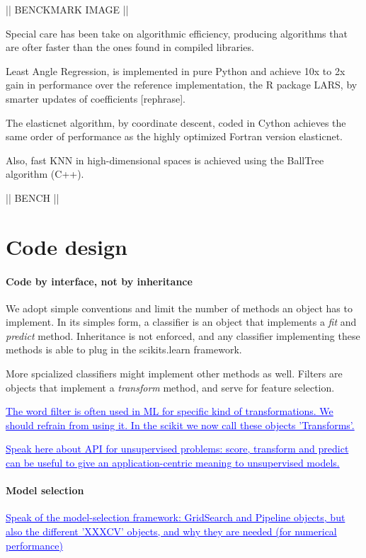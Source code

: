 \documentclass[twoside,11pt]{article}
\newcommand{\GAEL}[1]{\textcolor{blue}{\uline{#1}}}
\begin{document}
|| BENCKMARK IMAGE ||


Special care has been take on algorithmic efficiency, producing
algorithms that are ofter faster than the ones found in compiled
libraries.



Least Angle Regression, is implemented in pure Python and achieve 10x
to 2x gain in performance over the reference implementation, the R
package LARS, by smarter updates of coefficients [rephrase].


The elasticnet algorithm, by coordinate descent, coded in Cython
achieves the same order of performance as the highly optimized Fortran
version elasticnet.

Also, fast KNN in high-dimensional spaces is achieved using the
BallTree algorithm (C++).

|| BENCH ||

\section{Code design}

\paragraph{Code by interface, not by inheritance}
%
We adopt simple conventions and limit the number of methods an object
has to implement. In its simples form, a classifier is an object that
implements a \emph{fit} and \emph{predict} method. Inheritance is not
enforced, and any classifier implementing these methods is able to
plug in the scikits.learn framework.


More spcialized classifiers might implement other methods as
well. Filters are objects that implement a \emph{transform} method,
and serve for feature selection.

\GAEL{The word filter is often used in ML for specific kind of
transformations. We should refrain from using it. In the scikit we now
call these objects 'Transforms'. }

\GAEL{Speak here about API for unsupervised problems: score, transform and
predict can be useful to give an application-centric meaning to
unsupervised models.}

\paragraph{Model selection}

\GAEL{Speak of the model-selection framework: GridSearch and Pipeline
objects, but also the different 'XXXCV' objects, and why they are needed
(for numerical performance)}
\end{document}
